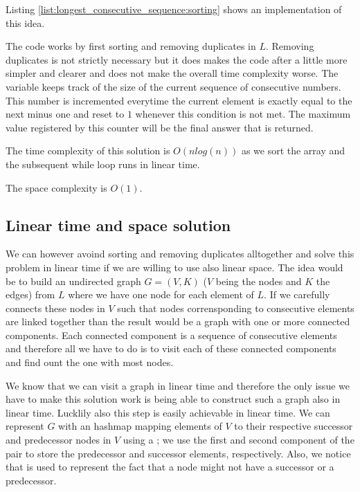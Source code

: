 Listing \ref{list:longest_consecutive_sequence:sorting} shows an implementation of this idea.




The code works by first sorting and removing duplicates in $L$. Removing duplicates is not strictly necessary but it does makes the code after a little more simpler and clearer and does not make the overall time complexity worse. The variable  keeps track of the size of the current sequence of consecutive numbers. This number is incremented everytime the current element is exactly equal to the next minus one and reset to $1$ whenever this condition is not met. 
The maximum value registered by this counter will be the final answer that is returned.

The time complexity of this solution is $O(n log(n))$ as we sort the array and the subsequent while loop runs in linear time. 

The space complexity is $O(1)$.

\subsection{Linear time and space solution}
\label{longest_consecutive_sequence:sec:lineartime}
We can however avoind sorting and removing duplicates alltogether and solve this problem in linear time if we are willing to use also linear space.
The idea would be to build an undirected graph $G=(V,K)$ ($V$ being the nodes and $K$ the edges) from $L$ where we have one node for each element of $L$.
If we carefully connects these nodes in $V$ such that nodes corrensponding to consecutive elements are linked together than the result would be a graph with one or more connected components. Each connected component is a sequence of consecutive elements and therefore all we have to do is to visit each of these connected components and find ount the one with most nodes.

We know that we can visit a graph in linear time and therefore the only issue we have to make this solution work is being able to construct such a 
graph also in linear time. 
Lucklily also this step is easily achievable in linear time. We can represent $G$ with an hashmap mapping elements of $V$ to their respective successor and predecessor nodes in $V$ using a ; we use the first and second component of the pair to store the predecessor and successor elements, respectively. 
Also, we notice that  is used to represent the fact that a node might not have a successor or a predecessor.

